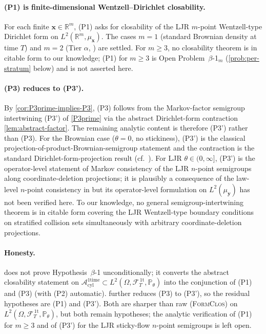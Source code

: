 \documentclass[11pt,reqno]{amsart}
\theoremstyle{plain}
\theoremstyle{definition}
\theoremstyle{remark}
\newcommand{\R}{\mathbb R}
\newcommand{\Prob}{\mathbb P}
\newcommand{\cA}{\mathcal A}
\newcommand{\cF}{\mathcal F}
\newcommand{\Aone}{\cA_{\mathrm{cyl}}^{\mathrm{1time}}}
\newcommand{\FT}{\cF_{T}^{\,\mathrm{1t}}}
\newcommand{\Hone}{L^{2}(\Omega,\FT,\Pth)}
\newcommand{\Pth}{\Prob_{\theta}}
\begin{document}
\paragraph{(P1) is finite-dimensional Wentzell--Dirichlet
closability.}
For each finite $\mathbf x\in\R^{m}$, (P1) asks for closability of
the LJR $m$-point Wentzell-type Dirichlet form on
$L^{2}(\R^{m},\mu_{\mathbf x})$. The cases $m=1$ (standard
Brownian density at time $T$) and $m=2$ (Tier $\alpha$,
\cite{StickyFlowGammaSeed}) are settled. For $m\ge 3$, no closability
theorem is in citable form to our knowledge; (P1) for $m\ge 3$ is
Open Problem~$\beta$-1${}_{m}$ (\cref{prob:per-stratum} below) and
is not asserted here.

\paragraph{(P3) reduces to (P3').}
By \cref{cor:P3prime-implies-P3}, (P3) follows from the
Markov-factor semigroup intertwining (P3') of \cref{P3prime} via
the abstract Dirichlet-form contraction \cref{lem:abstract-factor}.
The remaining analytic content is therefore (P3') rather than (P3).
For the Brownian case ($\theta=0$, no stickiness), (P3') is the
classical projection-of-product-Brownian-semigroup statement and
the contraction is the standard Dirichlet-form-projection result
(cf.~\cite[Thm.~1.6.1]{FOT}). For LJR $\theta\in(0,\infty]$,
(P3') is the operator-level statement of Markov consistency of
the LJR $n$-point semigroups along coordinate-deletion projections;
it is plausibly a consequence of the law-level $n$-point consistency
in \cite[\S 3]{LeJanRaimond2004} but its operator-level
formulation on $L^{2}(\mu_{\mathbf y})$ has not been verified
here. To our knowledge, no general semigroup-intertwining theorem
is in citable form covering the LJR Wentzell-type boundary
conditions on stratified collision sets simultaneously with
arbitrary coordinate-deletion projections.

\paragraph{Honesty.}
 does not prove Hypothesis~$\beta$-1
unconditionally; it converts the abstract closability statement on
$\Aone\subset\Hone$ into the conjunction of (P1) and (P3) (with
(P2) automatic).  further reduces (P3)
to (P3'), so the residual hypotheses are (P1) and (P3'). Both are
sharper than raw {\normalfont\textsc{(FormClos)}} on $\Hone$, but
both remain hypotheses; the analytic verification of (P1) for
$m\ge 3$ and of (P3') for the LJR sticky-flow $n$-point
semigroups is left open.
\end{document}
